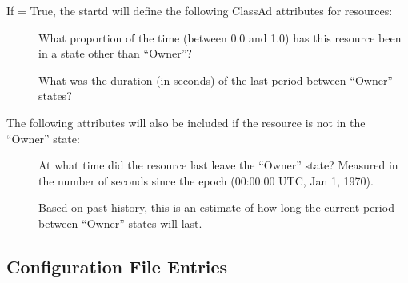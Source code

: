 If  = True, the startd will
define the following ClassAd attributes for resources:

\begin{description}
\item[]
  What proportion of the time (between 0.0 and 1.0)
  has this resource been in a state other than ``Owner''?
\item[]
  What was the duration (in seconds) of the
  last period between ``Owner'' states?
\end{description}

The following attributes will also be included if the resource is
not in the ``Owner'' state:

\begin{description}
\item[]
  At what time did the resource last leave the
  ``Owner'' state?  Measured in the number of seconds since the
  epoch (00:00:00 UTC, Jan 1, 1970).
\item[]
  Based on past history, this is an estimate
  of how long the current period between ``Owner'' states will
  last.
\end{description}


\subsection{\label{sec:Schedd-Config-File-Entries}
 Configuration File Entries}

